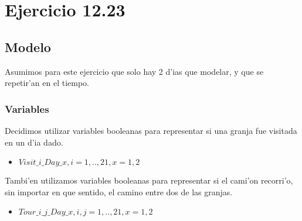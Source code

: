 \section{Ejercicio 12.23}
\subsection{Modelo}
Asumimos para este ejercicio que solo hay 2 d'ias que modelar, y que se repetir'an en el tiempo.
\subsubsection{Variables}
Decidimos utilizar variables booleanas para representar si una granja fue visitada en un d'ia dado.
\begin{itemize}
\item $Visit\_i\_Day\_x,  i = 1, .. ,21, x = 1,2$
\end{itemize}
Tambi'en utilizamos variables booleanas para representar si el cami'on recorri'o, sin importar en que sentido, el camino entre dos de las granjas.
\begin{itemize}
\item $Tour\_i\_j\_Day\_x,  i,j = 1, .. ,21, x = 1,2 $
\end{itemize}
